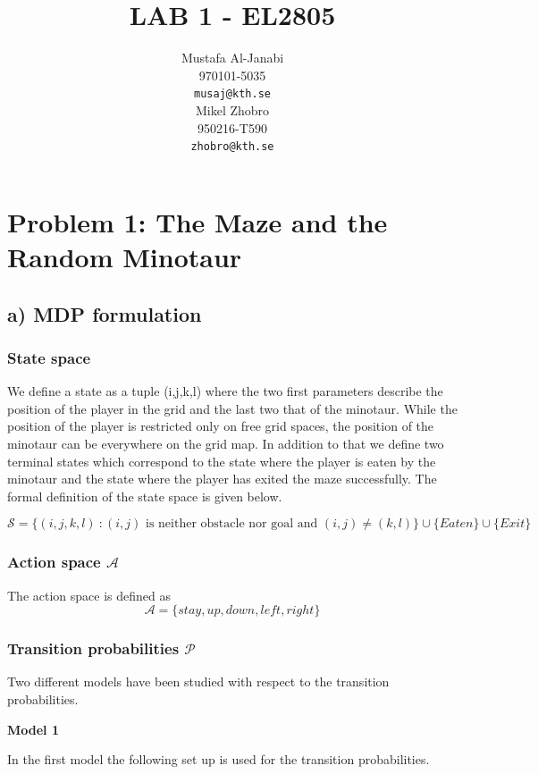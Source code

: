\documentclass{article}
\title{LAB 1 - EL2805}
\author{%
  Mustafa Al-Janabi \\
  970101-5035 \\
  \texttt{musaj@kth.se} \\
  \And  
  Mikel Zhobro \\
  950216-T590 \\
  \texttt{zhobro@kth.se} \\
  }
\begin{document}

\maketitle

\section{Problem 1: The Maze and the Random Minotaur}
\subsection{a) MDP formulation}
\subsubsection{State space}
We define a state as a tuple (i,j,k,l) where the two first parameters describe the position of the player in the grid and the last two that of the minotaur. While the position of the player is restricted only on free grid spaces, the position of the minotaur can be everywhere on the grid map. In addition to that we define two terminal states which 
correspond to the state where the player is eaten by the minotaur and the state where the player has exited the maze successfully. The formal definition of the state space is given below.

\begin{equation} 
\label{state_space_1}
\mathcal{S} = \Big\lbrace (i,j,k,l) ~:  (i,j) \textrm{ is neither obstacle nor goal and } (i,j)\neq (k,l) \Big\rbrace  \cup \Big\lbrace Eaten \Big\rbrace \cup \Big\lbrace Exit\Big\rbrace
\end{equation}

\subsubsection{Action space $\mathcal{A}$}
The action space is defined as 
\begin{equation}
    \mathcal{A} = \{stay, up, down, left, right \}
\end{equation}

\subsubsection{Transition probabilities $\mathcal{P}$}
Two different models have been studied with respect to the transition probabilities.
\par 
\textbf{Model 1}
\par
In the first model the following set up is used for the transition 
probabilities.
\end{document}
